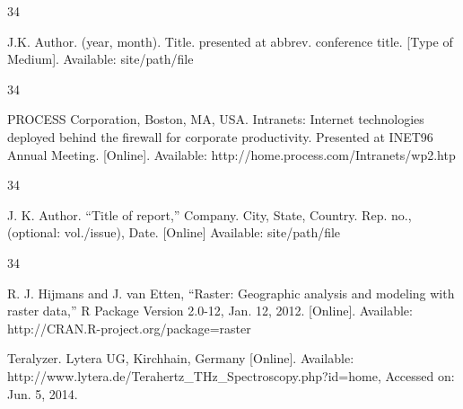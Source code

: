 \documentclass{IEEEojcsys}
\begin{document}
\vspace*{-12pt}
\begin{thebibliography}{34}
\item[]\hskip-18pt J.K. Author. (year, month). Title. presented at abbrev. conference title. [Type of Medium]. Available: site/path/file
\end{thebibliography}\vspace*{-12pt}

\vspace*{-12pt}

\begin{thebibliography}{34}
\setcounter{enumiv}{16}

\bibitem{}PROCESS Corporation, Boston, MA, USA. Intranets: Internet technologies deployed behind the firewall for corporate productivity. Presented at INET96 Annual Meeting. [Online]. Available: http://home.process.com/Intranets/wp2.htp
\end{thebibliography}\vspace*{-3pt}

\vspace*{-12pt}
\begin{thebibliography}{34}
\item[]\hskip-18pt J. K. Author. ``Title of report,'' Company. City, State, Country. Rep. no., (optional: vol./issue), Date. [Online] Available: site/path/file 
\end{thebibliography}\vspace*{-11pt}

\vspace*{-12pt}

\begin{thebibliography}{34}
\setcounter{enumiv}{17}

\bibitem{}R. J. Hijmans and J. van Etten, ``Raster: Geographic analysis and modeling with raster data,'' R Package Version 2.0-12, Jan. 12, 2012. [Online]. Available: http://CRAN.R-project.org/package=raster 

\bibitem{}Teralyzer. Lytera UG, Kirchhain, Germany [Online]. Available: http://www.lytera.de/Terahertz\_THz\_Spectroscopy.php?id=home, Accessed on: Jun. 5, 2014.
\end{thebibliography}\vspace*{-3pt}
\end{document}
